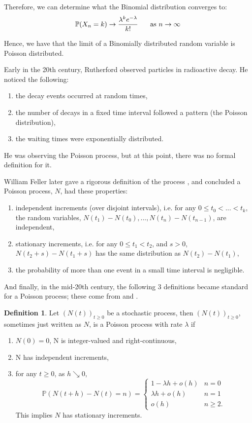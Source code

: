 \documentclass[11pt, oneside]{article}   	%
\theoremstyle{definition}
\newtheorem{definition}{Definition}[section]
\theoremstyle{remark}
\begin{document}
Therefore, we can determine what the Binomial distribution converges to:
$$\mathbb{P}(X_n=k)\to\frac{\lambda^k e^{-\lambda}}{k!} \hspace{5mm}\text{ as } n\to\infty$$

Hence, we have that the limit of a Binomially distributed random variable is Poisson distributed.

\vspace{5mm}

Early in the 20th century, Rutherford observed particles in radioactive decay. He noticed the following:

\begin{enumerate}[label=(\roman*)]
  \item the decay events occurred at random times,
  \item the number of decays in a fixed time interval followed a pattern (the Poisson distribution),
  \item the waiting times were exponentially distributed.
\end{enumerate}
He was observing the Poisson process, but at this point, there was no formal definition for it.

William Feller later gave a rigorous definition of the process \cite{feller1971}, and concluded a Poisson process, $N$, had these properties:
\begin{enumerate}[label=(\roman*)]
  \item independent increments (over disjoint intervals), i.e. for any $0\leq t_0 < ... < t_k$, the random variables, $N(t_1)-N(t_0),...,N(t_n)-N(t_{n-1})$, are independent,
  \item stationary increments, i.e. for any $0\leq t_1<t_2$, and $s>0$, $N(t_2+s)-N(t_1+s)$ has the same distribution as $N(t_2)-N(t_1)$,
  \item the probability of more than one event in a small time interval is negligible.
\end{enumerate}

And finally, in the mid-20th century, the following 3 definitions became standard for a Poisson process; these come from \cite{mit2011} and \cite{probability2-2024}.

\begin{definition} \label{def1}
  Let $(N(t))_{t\geq0}$ be a stochastic process, then $(N(t))_{t\geq0}$, sometimes just written as $N$, is a Poisson process with rate $\lambda$ if
  \begin{enumerate}[label=(\roman*)]
    \item $N(0)=0$, N is integer-valued and right-continuous,
    \item N has independent increments,
    \item for any $t\geq0$, as $h\searrow 0$, 
      $$\mathbb{P}\left(N(t+h)-N(t)=n\right) = \begin{cases} 1-\lambda h+o(h) &n=0 \\ \lambda h + o(h) &n=1 \\ o(h) &n\geq2. \end{cases}$$ 
      This implies $N$ has stationary increments.
  \end{enumerate}
\end{definition}
\end{document}
